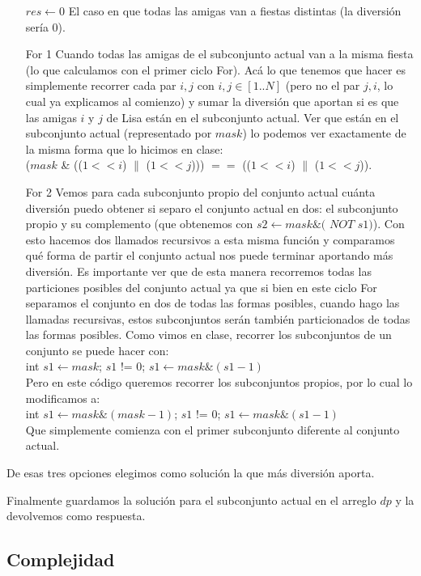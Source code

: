 \begin{itemize}
    \item [$res \gets 0$] El caso en que todas las amigas van a fiestas distintas (la diversión sería 0).
    \item [For 1] Cuando todas las amigas de el subconjunto actual van a la misma fiesta (lo que calculamos con el primer ciclo For). Acá lo que tenemos que hacer es simplemente recorrer cada par $i,j$ con $i,j \in [1..N]$ (pero no el par $j,i$, lo cual ya explicamos al comienzo) y sumar la diversión que aportan si es que las amigas $i$ y $j$ de Lisa están en el subconjunto actual. Ver que están en el subconjunto actual (representado por $mask$) lo podemos ver exactamente de la misma forma que lo hicimos en clase: \\
    ($mask$ \& (($1 << i$) $\|$ ($1 << j$))) $==$ (($1 << i$) $\|$ ($1 << j$)).
    \item [For 2] Vemos para cada subconjunto propio del conjunto actual cuánta diversión puedo obtener si separo el conjunto actual en dos: el subconjunto propio y su complemento (que obtenemos con $s2 \gets mask \& ($ $NOT$ $ s1)$). Con esto hacemos dos llamados recursivos a esta misma función y comparamos qué forma de partir el conjunto actual nos puede terminar aportando más diversión. Es importante ver que de esta manera recorremos todas las particiones posibles del conjunto actual ya que si bien en este ciclo For separamos el conjunto en dos de todas las formas posibles, cuando hago las llamadas recursivas, estos subconjuntos serán también particionados de todas las formas posibles. Como vimos en clase, recorrer los subconjuntos de un conjunto se puede hacer con: \\
    int $s1 \gets mask$; $s1$ != $0$; $s1 \gets mask \& (s1-1)$ \\
    Pero en este código queremos recorrer los subconjuntos propios, por lo cual lo modificamos a: \\
    int $s1 \gets mask \& (mask-1)$; $s1$ != $0$; $s1 \gets mask \& (s1-1)$ \\
    Que simplemente comienza con el primer subconjunto diferente al conjunto actual.
\end{itemize}

De esas tres opciones elegimos como solución la que más diversión aporta.

Finalmente guardamos la solución para el subconjunto actual en el arreglo $dp$ y la devolvemos como respuesta.

\subsection{Complejidad}


